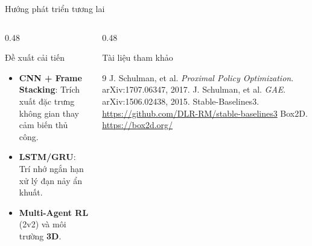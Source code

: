 \documentclass[aspectratio=169]{beamer}
\begin{document}
\begin{frame}{Hướng phát triển tương lai}
  \begin{columns}[T]
    \begin{column}{0.48\textwidth}
      \begin{block}{Đề xuất cải tiến}
        \begin{itemize}
          \item \textbf{CNN + Frame Stacking}: Trích xuất đặc trưng không gian thay cảm biến thủ công.
          \item \textbf{LSTM/GRU}: Trí nhớ ngắn hạn xử lý đạn nảy ẩn khuất.
          \item \textbf{Multi-Agent RL} (2v2) và môi trường \textbf{3D}.
        \end{itemize}
      \end{block}
    \end{column}
    \begin{column}{0.48\textwidth}
      \begin{block}{Tài liệu tham khảo}
        \tiny
        \begin{thebibliography}{9}
           J. Schulman, et al. \textit{Proximal Policy Optimization}. arXiv:1707.06347, 2017.
           J. Schulman, et al. \textit{GAE}. arXiv:1506.02438, 2015.
           Stable-Baselines3. \url{https://github.com/DLR-RM/stable-baselines3}
           Box2D. \url{https://box2d.org/}
        \end{thebibliography}
      \end{block}
    \end{column}
  \end{columns}
\end{frame}
\end{document}
